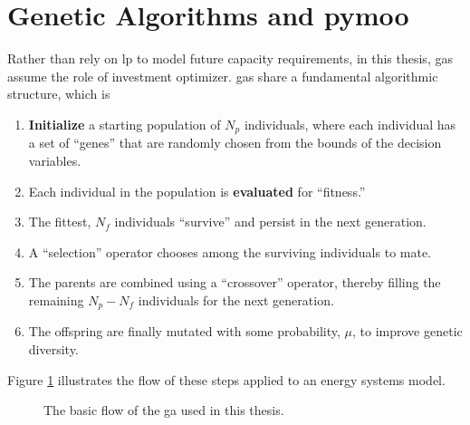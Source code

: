 \section{Genetic Algorithms and \acs{pymoo}}
\label{section:genetic-algorithms}

Rather than rely on \ac{lp} to model future capacity requirements, in this
thesis, \acp{ga} assume the role of investment optimizer. \acp{ga} share a
fundamental algorithmic structure, which is \cite{blank_pymoo_2020}
\begin{enumerate}
    \item \textbf{Initialize} a starting population of $N_p$ individuals, where
    each individual has a set of ``genes'' that are randomly chosen from the
    bounds of the decision variables.
    \item Each individual in the population is \textbf{evaluated} for
    ``fitness.'' 
    \item The fittest, $N_f$ individuals ``survive'' and persist in the next
    generation.
    \item A ``selection'' operator chooses among the surviving individuals to
    mate.
    \item The parents are combined using a ``crossover'' operator, thereby
    filling the remaining $N_p - N_f$ individuals for the next generation.
    \item The offspring are finally mutated with some probability, $\mu$, to
    improve genetic diversity.
\end{enumerate}
\noindent
Figure \ref{fig:genetic-alg} illustrates the flow of these steps applied to an
energy systems model.

\begin{figure}[ht]
        \centering
        \caption{The basic flow of the \ac{ga} used in this thesis.}
        \label{fig:genetic-alg}
\end{figure}

